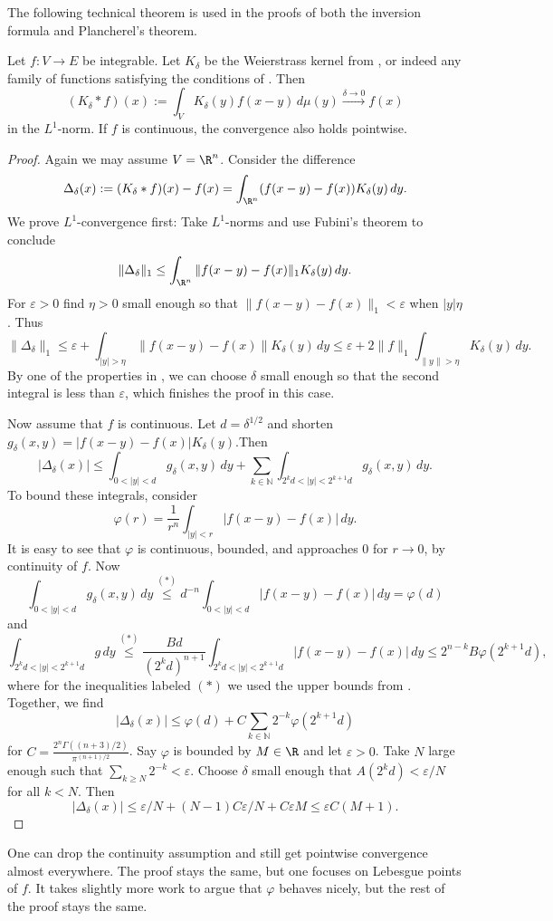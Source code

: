 The following technical theorem is used in the proofs of both the inversion formula and Plancherel's theorem.
\begin{theorem}
\label{thm:kernel-approximation}
\leanok
Let $f:V\to E$ be integrable. Let $K_\delta$ be the Weierstrass kernel from ,
or indeed any family of functions satisfying the conditions of . Then
$$(K_\delta\ast f)(x):=\int_V K_\delta(y)f(x-y)\,d\mu(y)\xrightarrow{\delta\to0}f(x)$$ in the $L^1$-norm.
If $f$ is continuous, the convergence also holds pointwise.
\end{theorem}
\begin{proof}
\leanok
Again we may assume $V=\R^n$. Consider the difference $$\Delta_\delta(x):=(K_\delta\ast f)(x)-f(x)=
\int_{\R^n}(f(x-y)-f(x))K_\delta(y)\,dy.$$ We prove $L^1$-convergence first:
Take $L^1$-norms and use Fubini's theorem to conclude
$$\|\Delta_\delta\|_1\leq\int_{\R^n}\|f(x-y)-f(x)\|_1K_\delta(y)\,dy.$$ For $\varepsilon>0$ find $\eta>0$
small enough so that $\|f(x-y)-f(x)\|_1<\varepsilon$ when $|y|\eta$. Thus
$$\|\Delta_\delta\|_1\leq\varepsilon+\int_{|y|>\eta}\|f(x-y)-f(x)\|K_\delta(y)\,dy\leq\varepsilon+2\|f\|_1\int_{\|y\|>\eta}K_\delta(y)\,dy.$$
By one of the properties in , we can choose $\delta$ small enough so that the second integral
is less than $\varepsilon$, which finishes the proof in this case.

Now assume that $f$ is continuous.
Let $d=\delta^{1/2}$ and shorten $g_\delta(x,y)=|f(x-y)-f(x)|K_\delta(y)$.Then
 $$|\Delta_\delta(x)|\leq\int_{0<|y|<d}g_\delta(x,y)\,dy+\sum_{k\in\mathbb N}\int_{2^kd<|y|<2^{k+1}d}g_\delta(x,y)\,dy.$$
 To bound these integrals, consider
 $$\varphi(r)=\frac1{r^n}\int_{|y|<r}|f(x-y)-f(x)|\,dy.$$
 It is easy to see that $\varphi$ is continuous, bounded, and approaches $0$ for $r\to0$, by continuity of $f$.
 Now $$\int_{0<|y|<d}g_\delta(x,y)\,dy\overset{(\ast)}\leq d^{-n}\int_{0<|y|<d}|f(x-y)-f(x)|\,dy=\varphi(d)$$ and
 $$\int_{2^kd<|y|<2^{k+1}d}g\,dy\overset{(\ast)}\leq
 \frac{Bd}{(2^kd)^{n+1}}\int_{2^kd<|y|<2^{k+1}d}|f(x-y)-f(x)|\,dy\leq2^{n-k}B\varphi(2^{k+1}d),$$
 where for the inequalities labeled $(\ast)$ we used the upper bounds from .
 Together, we find
 $$|\Delta_\delta(x)|\leq\varphi(d)+C\sum_{k\in\mathbb N}2^{-k}\varphi(2^{k+1}d)$$ for
 $C=\frac{2^n\Gamma((n+3)/2)}{\pi^{(n+1)/2}}$. Say $\varphi$ is bounded by $M\in\R$ and let $\varepsilon>0$.
 Take $N$ large enough such that $\sum_{k\geq N}2^{-k}<\varepsilon$. Choose $\delta$ small enough that
 $A(2^kd)<\varepsilon/N$ for all $k<N$. Then
 $$|\Delta_\delta(x)|\leq\varepsilon/N+(N-1)C\varepsilon/N+C\varepsilon M\leq \varepsilon C(M+1).$$
\end{proof}
\begin{remark}
  One can drop the continuity assumption and still get pointwise convergence almost everywhere. The proof stays the same,
  but one focuses on Lebesgue points of $f$. It takes slightly more work to argue that $\varphi$ behaves nicely,
  but the rest of the proof stays the same.
\end{remark}

